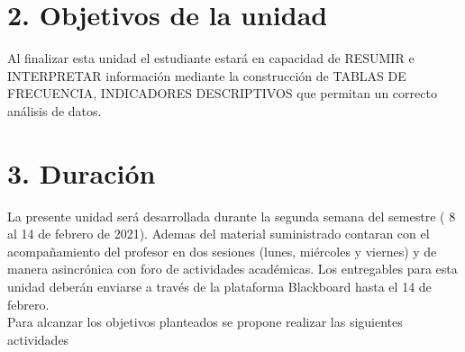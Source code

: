 \documentclass[base=hide,11pt]{elegantbook}
\begin{document}
\section*{2. Objetivos de la unidad}
Al finalizar esta unidad el estudiante estará en capacidad de RESUMIR e INTERPRETAR información mediante la construcción de TABLAS DE FRECUENCIA, INDICADORES DESCRIPTIVOS que permitan un correcto análisis de datos. 

\section*{3. Duración}
La presente  unidad será desarrollada durante la  segunda semana del semestre ( 8 al 14 de febrero de 2021). Ademas del material suministrado  contaran con el acompañamiento del profesor en dos sesiones (lunes, miércoles y viernes) y de manera asincrónica con  foro de actividades académicas. Los entregables para esta unidad deberán enviarse a través de la plataforma Blackboard hasta el  14 de febrero. \\

Para alcanzar los objetivos planteados se propone realizar las siguientes actividades
% 	
\end{document}
